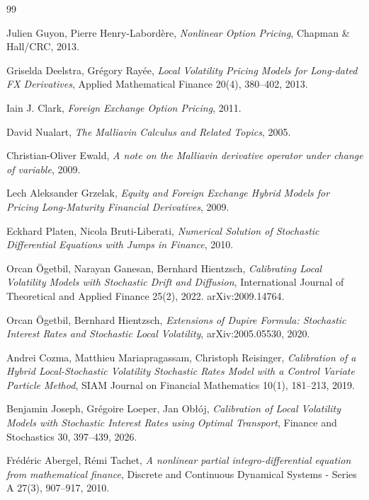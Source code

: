 \begin{thebibliography}{99}

  Julien Guyon, Pierre Henry-Labord\`ere,
  \emph{Nonlinear Option Pricing},
  Chapman \& Hall/CRC, 2013.

  Griselda Deelstra, Gr\'egory Ray\'ee,
  \emph{Local Volatility Pricing Models for Long-dated FX Derivatives},
  Applied Mathematical Finance 20(4), 380--402, 2013.

  Iain J. Clark,
  \emph{Foreign Exchange Option Pricing},
  2011.

  David Nualart,
  \emph{The Malliavin Calculus and Related Topics},
  2005.

  Christian-Oliver Ewald,
  \emph{A note on the Malliavin derivative operator under change of variable},
  2009.

  Lech Aleksander Grzelak,
  \emph{Equity and Foreign Exchange Hybrid Models for Pricing Long-Maturity Financial Derivatives},
  2009.

  Eckhard Platen, Nicola Bruti-Liberati,
  \emph{Numerical Solution of Stochastic Differential Equations with Jumps in Finance},
  2010.

  Orcan \"Ogetbil, Narayan Ganesan, Bernhard Hientzsch,
  \emph{Calibrating Local Volatility Models with Stochastic Drift and Diffusion},
  International Journal of Theoretical and Applied Finance 25(2), 2022. arXiv:2009.14764.

  Orcan \"Ogetbil, Bernhard Hientzsch,
  \emph{Extensions of Dupire Formula: Stochastic Interest Rates and Stochastic Local Volatility},
  arXiv:2005.05530, 2020.

  Andrei Cozma, Matthieu Mariapragassam, Christoph Reisinger,
  \emph{Calibration of a Hybrid Local-Stochastic Volatility Stochastic Rates Model with a Control Variate Particle Method},
  SIAM Journal on Financial Mathematics 10(1), 181--213, 2019.

  Benjamin Joseph, Gr\'egoire Loeper, Jan Ob{\l}\'oj,
  \emph{Calibration of Local Volatility Models with Stochastic Interest Rates using Optimal Transport},
  Finance and Stochastics 30, 397--439, 2026.

  Fr\'ed\'eric Abergel, R\'emi Tachet,
  \emph{A nonlinear partial integro-differential equation from mathematical finance},
  Discrete and Continuous Dynamical Systems - Series A 27(3), 907--917, 2010.


\end{thebibliography}
